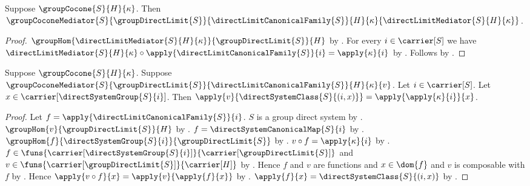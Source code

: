 \begin{theorem}\label{direct_limit_mediator_is_mediator}
    Suppose $\groupCocone{S}{H}{\kappa}$.
    Then $\groupCoconeMediator
        {S}{\groupDirectLimit{S}}{\directLimitCanonicalFamily{S}}
        {H}{\kappa}{\directLimitMediator{S}{H}{\kappa}}$.
\end{theorem}
\begin{proof}
    $\groupHom
        {\directLimitMediator{S}{H}{\kappa}}
        {\groupDirectLimit{S}}{H}$ by
        .
    For every $i\in\carrier[S]$ we have
        $\directLimitMediator{S}{H}{\kappa}\circ
            \apply{\directLimitCanonicalFamily{S}}{i}
        =\apply{\kappa}{i}$ by
        .
    Follows by .
\end{proof}

\begin{lemma}\label{canonical_cocone_mediator_apply}
    Suppose $\groupCocone{S}{H}{\kappa}$.
    Suppose $\groupCoconeMediator
        {S}{\groupDirectLimit{S}}{\directLimitCanonicalFamily{S}}
        {H}{\kappa}{v}$.
    Let $i\in\carrier[S]$.
    Let $x\in\carrier[\directSystemGroup{S}{i}]$.
    Then $\apply{v}{\directSystemClass{S}{(i,x)}}
        =\apply{\apply{\kappa}{i}}{x}$.
\end{lemma}
\begin{proof}
    Let $f=\apply{\directLimitCanonicalFamily{S}}{i}$.
    $S$ is a group direct system by
        .
    $\groupHom{v}{\groupDirectLimit{S}}{H}$ by
        .
    $f=\directSystemCanonicalMap{S}{i}$ by
        .
    $\groupHom{f}{\directSystemGroup{S}{i}}
        {\groupDirectLimit{S}}$ by
        .
    $v\circ f=\apply{\kappa}{i}$ by
        .
    $f\in\funs{\carrier[\directSystemGroup{S}{i}]}
        {\carrier[\groupDirectLimit{S}]}$ and
        $v\in\funs{\carrier[\groupDirectLimit{S}]}{\carrier[H]}$ by
        .
    Hence $f$ and $v$ are functions and
        $x\in\dom{f}$ and $v$ is composable with $f$ by
        .
    Hence $\apply{v\circ f}{x}=\apply{v}{\apply{f}{x}}$ by
        .
    $\apply{f}{x}=\directSystemClass{S}{(i,x)}$ by
        .
\end{proof}

